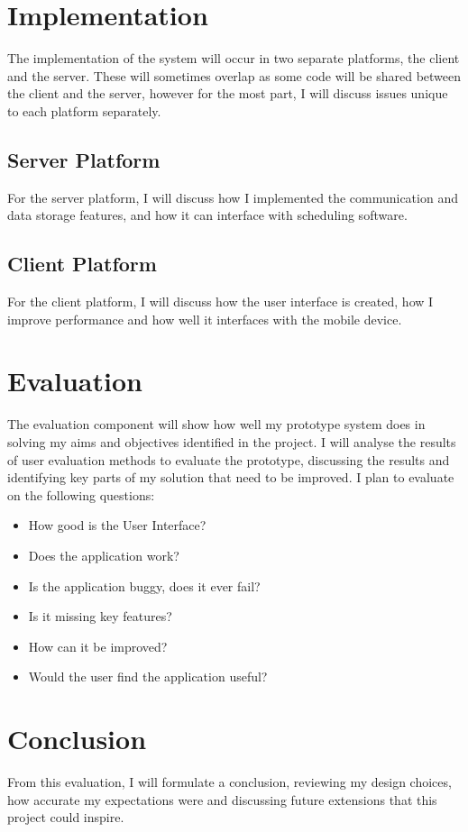 
\section{Implementation}

The implementation of the system will occur in two separate platforms, the client and the server. These will sometimes overlap as some code will be shared between the client and the server, however for the most part, I will discuss issues unique to each platform separately.

\subsection{Server Platform}

For the server platform, I will discuss how I implemented the communication and data storage features, and how it can interface with scheduling software.

\subsection{Client Platform}

For the client platform, I will discuss how the user interface is created, how I improve performance and how well it interfaces with the mobile device.


\section{Evaluation}

The evaluation component will show how well my prototype system does in solving my aims and objectives identified in the project. I will analyse the results of user evaluation methods to evaluate the prototype, discussing the results and identifying key parts of my solution that need to be improved. I plan to evaluate on the following questions:

\begin{itemize}
	\item How good is the User Interface?
	\item Does the application work?
	\item Is the application buggy, does it ever fail?
	\item Is it missing key features?
	\item How can it be improved?
	\item Would the user find the application useful?
\end{itemize}

\section{Conclusion}

From this evaluation, I will formulate a conclusion, reviewing my design choices, how accurate my expectations were and discussing future extensions that this project could inspire.

